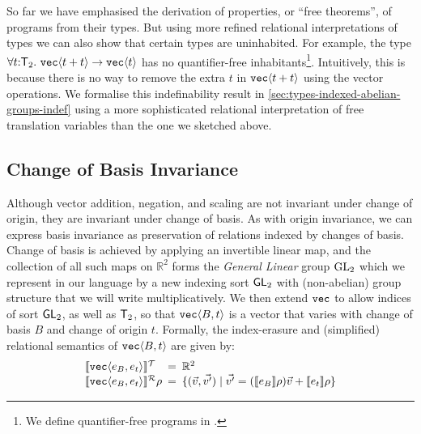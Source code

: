 \begin{example}\label{ex:uninhabited-type}
  So far we have emphasised the derivation of properties, or ``free
  theorems'', of programs from their types. But using more refined
  relational interpretations of types we can also show that certain
  types are uninhabited. For example, the type $\forall t \mathord:
  \mathsf{T}_2.\ \textup{\texttt{vec}}\langle t + t \rangle \to \textup{\texttt{vec}}\langle t \rangle$ has no
  quantifier-free inhabitants\footnote{We define quantifier-free
    programs in .}. Intuitively, this is
  because there is no way to remove the extra $t$ in
  $\textup{\texttt{vec}}\langle t+t \rangle$ using the vector operations. We formalise this
  indefinability result in \autoref{sec:types-indexed-abelian-groups-indef}
  using a more sophisticated relational interpretation of free
  translation variables than the one we sketched above.
\end{example}

\subsection{Change of Basis Invariance}
\label{sec:motivation-generalising}

Although vector addition, negation, and scaling are not invariant
under change of origin, they are invariant under change of basis. As
with origin invariance, we can express basis invariance as
preservation of relations indexed by changes of basis. Change of basis
is achieved by applying an invertible linear map, and the collection of
all such maps on $\mathbb{R}^2$ forms the \emph{General Linear} group
$\mathrm{GL}_2$ which we represent in our language by a new indexing sort
$\mathsf{GL}_2$ with (non-abelian) group structure that we will write
multiplicatively. We then extend $\textup{\texttt{vec}}$ to allow indices of
sort $\mathsf{GL}_2$, as well as $\mathsf{T}_2$, so that
$\textup{\texttt{vec}}\langle B,t \rangle$ is a vector that varies with change of basis $B$
and change of origin $t$. Formally, the index-erasure and (simplified)
relational semantics of $\textup{\texttt{vec}}\langle B,t \rangle$ are given by:
\begin{displaymath}
  \begin{array}{l@{\hspace{0.5em}=\hspace{0.5em}}l}
    \tySem{\tyPrim{vec}{e_B,e_t}} & \mathbb{R}^2
    \\ \rsem{\tyPrim{vec}{e_B,e_t}}{}\rho & \{ (\vec{v},\vec{v'})
    \sepbar \vec{v'} = (\sem{e_B}\rho)\vec{v} + \sem{e_t}\rho \}
  \end{array}
\end{displaymath}

